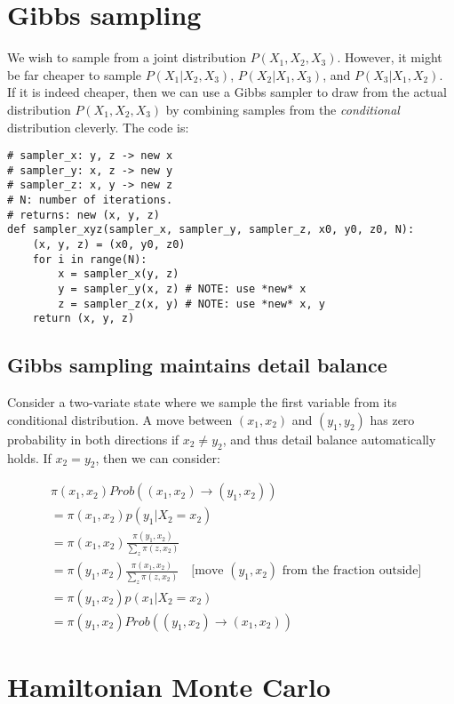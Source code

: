 \documentclass[titlepage]{article}
\begin{document}
\section{Gibbs sampling}
We wish to sample from a joint distribution $P(X_1, X_2, X_3)$. However, it might
be far cheaper to sample $P(X_1 | X_2, X_3)$, $P(X_2 | X_1, X_3)$, and
$P(X_3 | X_1, X_2)$. If it is indeed cheaper, then we can use a Gibbs sampler
to draw from the actual distribution $P(X_1, X_2, X_3)$ by combining samples
from the \emph{conditional} distribution cleverly. The code is:

\begin{verbatim}
# sampler_x: y, z -> new x
# sampler_y: x, z -> new y
# sampler_z: x, y -> new z
# N: number of iterations.
# returns: new (x, y, z)
def sampler_xyz(sampler_x, sampler_y, sampler_z, x0, y0, z0, N):
    (x, y, z) = (x0, y0, z0)
    for i in range(N):
        x = sampler_x(y, z)
        y = sampler_y(x, z) # NOTE: use *new* x
        z = sampler_z(x, y) # NOTE: use *new* x, y
    return (x, y, z)
\end{verbatim}

\subsection{Gibbs sampling maintains detail balance}
Consider a two-variate state where we sample the first variable from its conditional distribution.
A move between  $(x_1, x_2)$ and $(y_1, y_2)$ has zero probability in both directions
if $x_2\neq y_2$, and thus detail balance automatically holds. If $x_2 = y_2$, then
we can consider:

\begin{align*}
&\pi(x_1, x_2)  Prob((x_1, x_2) \rightarrow (y_1, x_2)) \\
&= \pi(x_1, x_2) p(y_1 | X_2 = x_2) \\
&= \pi(x_1, x_2) \frac{\pi(y_1, x_2)}{\sum_z \pi(z, x_2)} \\
&= \pi(y_1, x_2) \frac{\pi(x_1, x_2)}{\sum_z \pi(z, x_2)} \quad \text{[move $(y_1, x_2)$ from the fraction outside]} \\
&=\pi(y_1, x_2) p(x_1 | X_2 = x_2) \\
&= \pi(y_1, x_2) Prob((y_1, x_2) \rightarrow (x_1, x_2))
\end{align*}

\section{Hamiltonian Monte Carlo}
\end{document}
